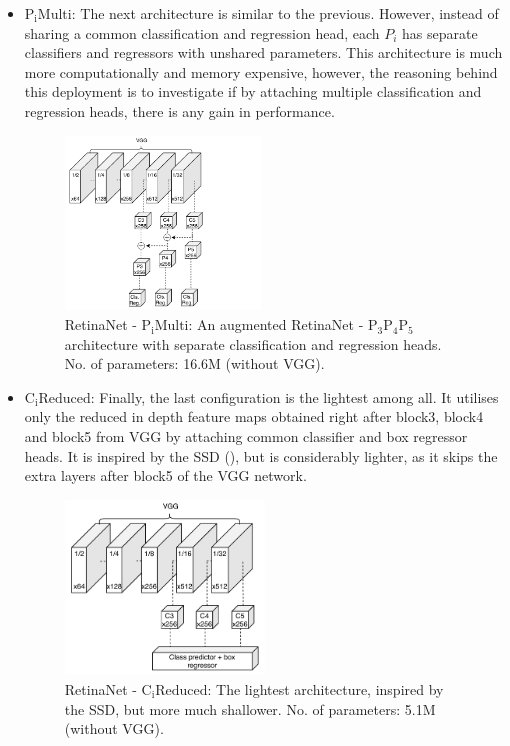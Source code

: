 \begin{itemize}
 \item{\textbf{$\text{P}_\text{i}\text{Multi}$}:}\label{arch_3}
The next architecture is similar to the previous. However, instead of sharing a common classification and regression head, each $P_i$ has separate classifiers and regressors with unshared parameters. This architecture is much more computationally and memory expensive, however, the reasoning behind this deployment is to investigate if by attaching multiple classification and regression heads, there is any gain in performance.

\begin{figure}[!htb]
  \centering
  \includegraphics[width=0.49\textwidth]{figures/ch4/fig5.pdf}
  \caption{RetinaNet - $\text{P}_\text{i}\text{Multi}$: An augmented RetinaNet - $\text{P}_3\text{P}_4\text{P}_5$ architecture with separate classification and regression heads. No. of parameters: 16.6M (without VGG).}
  \label{ch4:fig5}
\end{figure} 

 \item{\textbf{$\text{C}_\text{i}\text{Reduced}$}:} 
Finally, the last configuration is the lightest among all. It utilises only the reduced in depth feature maps obtained right after block3, block4 and block5 from VGG by attaching common classifier and box regressor heads. It is inspired by the SSD (\cite{liu2016ssd}), but is considerably lighter, as it skips the extra layers after block5 of the VGG network.

\begin{figure}[!htb]
  \centering
  \includegraphics[width=0.5\textwidth]{figures/ch4/fig6.pdf}
  \caption{RetinaNet - $\text{C}_\text{i}\text{Reduced}$: The lightest architecture, inspired by the SSD, but more much shallower. No. of parameters: 5.1M (without VGG).}
  \label{ch4:fig6}
\end{figure} 

\end{itemize}

